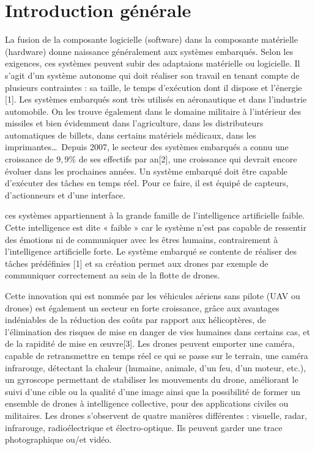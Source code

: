 
\chapter{Introduction générale}


La fusion de la composante logicielle (software) dans la composante matérielle (hardware) donne naissance généralement aux systèmes embarqués.
Selon les exigences, ces systèmes peuvent subir des adaptaions matérielle ou logicielle. Il s'agit d'un système autonome qui doit réaliser son travail en tenant compte de plusieurs contraintes : sa taille, le temps d'exécution dont il dispose et l'énergie [1]. Les systèmes embarqués sont très utilisés en aéronautique et dans l'industrie automobile. On les trouve également dans le domaine militaire à l'intérieur des missiles et bien évidemment dans l'agriculture, dans les distributeurs automatiques de billets, dans certains matériels médicaux, dans les imprimantes\ldots\  Depuis 2007, le secteur des systèmes embarqués a connu une croissance de $9,9\%$ de ses effectifs par an[2], une croissance qui devrait encore évoluer dans les prochaines années. Un système embarqué doit être capable d'exécuter des tâches en temps réel. Pour ce faire, il est équipé de capteurs, d'actionneurs et d'une interface.  

ces systèmes appartiennent à la grande famille de l'intelligence artificielle faible. Cette intelligence est dite « faible » car le système n'est pas capable de ressentir des émotions ni de communiquer avec les êtres humains, contrairement à l'intelligence artificielle forte. Le système embarqué se contente de réaliser des tâches prédéfinies [1] et sa création permet aux drones par exemple de communiquer correctement au sein de la flotte de drones. 



Cette innovation qui est nommée par les véhicules aériens sans pilote (UAV ou drones) est également un secteur en forte croissance, grâce aux avantages indéniables de la réduction des coûts par rapport aux hélicoptères, de l'élimination des risques de mise en danger de vies humaines dans certains cas, et de la rapidité de mise en œuvre[3]. Les drones peuvent emporter une caméra, capable de retransmettre en temps réel ce qui se passe sur le terrain, une caméra infrarouge, détectant la chaleur (humaine, animale, d'un feu, d'un moteur, etc.), un gyroscope permettant de stabiliser les mouvements du drone, améliorant le suivi d'une cible ou la qualité d'une image ainsi que la possibilité de former un ensemble de drones à intelligence collective, pour des applications civiles ou militaires.  Les drones s'observent de quatre manières différentes : visuelle, radar, infrarouge, radioélectrique et électro-optique.  Ils peuvent garder une trace photographique ou/et vidéo.



